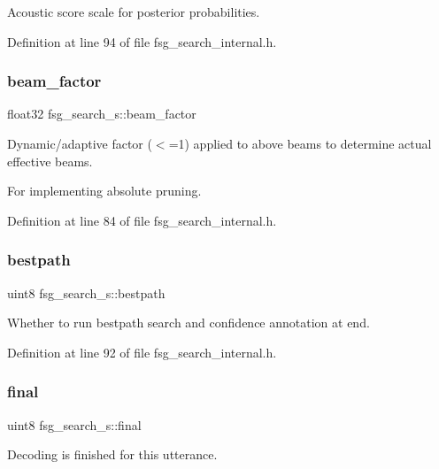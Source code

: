 Acoustic score scale for posterior probabilities. 



Definition at line 94 of file fsg\+\_\+search\+\_\+internal.\+h.

\mbox{\label{structfsg__search__s_a8e86d9f82189f8429d71ee2f67ecaaa2}} 
\subsubsection{beam\+\_\+factor}
{\footnotesize\ttfamily float32 fsg\+\_\+search\+\_\+s\+::beam\+\_\+factor}



Dynamic/adaptive factor ($<$=1) applied to above beams to determine actual effective beams. 

For implementing absolute pruning. 

Definition at line 84 of file fsg\+\_\+search\+\_\+internal.\+h.

\mbox{\label{structfsg__search__s_aba7eff57919c5a1de55eab3a62ff055a}} 
\subsubsection{bestpath}
{\footnotesize\ttfamily uint8 fsg\+\_\+search\+\_\+s\+::bestpath}



Whether to run bestpath search and confidence annotation at end. 



Definition at line 92 of file fsg\+\_\+search\+\_\+internal.\+h.

\mbox{\label{structfsg__search__s_a5139d7ab35ae18407e06e78e1778f857}} 
\subsubsection{final}
{\footnotesize\ttfamily uint8 fsg\+\_\+search\+\_\+s\+::final}



Decoding is finished for this utterance. 




